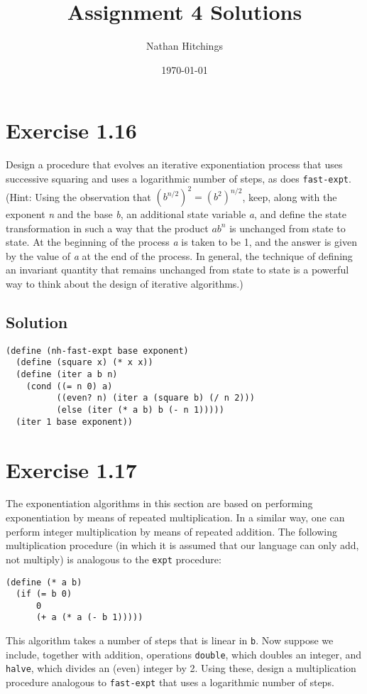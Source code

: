 \documentclass[11pt]{article}
\author{Nathan Hitchings}
\date{\today}
\title{Assignment 4 Solutions}
\begin{document}
\maketitle
\section{Exercise 1.16}
\label{sec:org2ba22e3}
Design a procedure that evolves an iterative exponentiation process that uses
successive squaring and uses a logarithmic number of steps, as does
\texttt{fast-expt}. (Hint: Using the observation that \((b^{n/2})^2 = (b^2)^{n/2}\), keep, along with the exponent \emph{n} and the base \emph{b}, an additional state
variable \emph{a}, and define the state transformation in such a way that the
product \(ab^n\) is unchanged from state to state. At the beginning of the
process \emph{a} is taken to be 1, and the answer is given by the value of \emph{a} at
the end of the process. In general, the technique of defining an invariant
quantity that remains unchanged from state to state is a powerful way to think
about the design of iterative algorithms.)
\subsection{Solution}
\label{sec:orgc9df710}
\begin{verbatim}
(define (nh-fast-expt base exponent)
  (define (square x) (* x x))
  (define (iter a b n)
    (cond ((= n 0) a)
          ((even? n) (iter a (square b) (/ n 2)))
          (else (iter (* a b) b (- n 1)))))
  (iter 1 base exponent))
\end{verbatim}
\section{Exercise 1.17}
\label{sec:org9cb68db}
The exponentiation algorithms in this section are based on performing
exponentiation by means of repeated multiplication. In a similar way, one can
perform integer multiplication by means of repeated addition. The following
multiplication procedure (in which it is assumed that our language can only
add, not multiply) is analogous to the \texttt{expt} procedure:
\begin{verbatim}
(define (* a b)
  (if (= b 0)
      0
      (+ a (* a (- b 1)))))
\end{verbatim}
This algorithm takes a number of steps that is linear in \texttt{b}. Now suppose we
include, together with addition, operations \texttt{double}, which doubles an
integer, and \texttt{halve}, which divides an (even) integer by 2. Using these,
design a multiplication procedure analogous to \texttt{fast-expt} that uses a
logarithmic number of steps.
\end{document}
